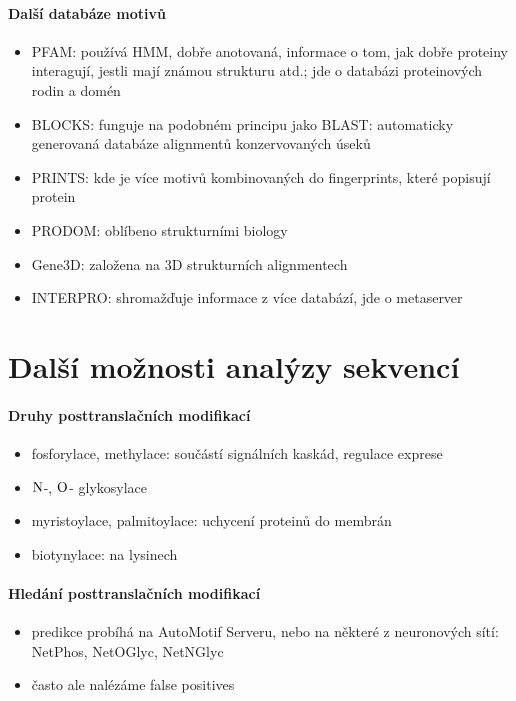 \documentclass[DIV=8]{scrreprt}
\begin{document}
\paragraph{Další databáze motivů}
\begin{itemize}[nosep]
    \item PFAM: používá HMM, dobře anotovaná, informace o tom, jak dobře proteiny interagují, jestli mají známou strukturu atd.; jde o databázi proteinových rodin a domén
    \item BLOCKS: funguje na podobném principu jako BLAST: automaticky generovaná databáze alignmentů konzervovaných úseků
    \item PRINTS: kde je více motivů kombinovaných do fingerprints, které popisují protein
    \item PRODOM: oblíbeno strukturními biology
    \item Gene3D: založena na 3D strukturních alignmentech
    \item INTERPRO: shromažďuje informace z více databází, jde o metaserver
\end{itemize}



\section{Další možnosti analýzy sekvencí} \label{Další možnosti analýzy sekvencí}


\paragraph{Druhy posttranslačních modifikací}
\begin{itemize}[nosep]
    \item fosforylace, methylace: součástí signálních kaskád, regulace exprese
    \item \(\ce{N}\)-, \(\ce{O}\)- glykosylace
    \item myristoylace, palmitoylace: uchycení proteinů do membrán
    \item biotynylace: na lysinech
\end{itemize}



\paragraph{Hledání posttranslačních modifikací}
\begin{itemize}[nosep]
    \item predikce probíhá na AutoMotif Serveru, nebo na některé z neuronových sítí: NetPhos, NetOGlyc, NetNGlyc
    \item často ale nalézáme false positives
\end{itemize}
\end{document}
